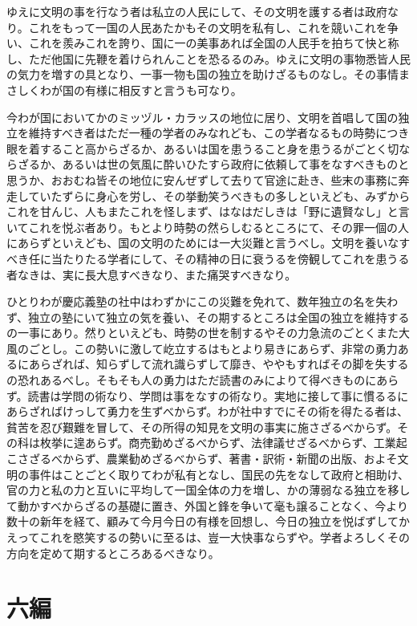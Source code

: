 \documentclass[a4paper, platex, dvipdfmx]{jsarticle}
\begin{document}
ゆえに文明の事を行なう者は私立の人民にして、その文明を護する者は政府なり。これをもって一国の人民あたかもその文明を私有し、これを競いこれを争い、これを羨みこれを誇り、国に一の美事あれば全国の人民手を拍ちて快と称し、ただ他国に先鞭を着けられんことを恐るるのみ。ゆえに文明の事物悉皆人民の気力を増すの具となり、一事一物も国の独立を助けざるものなし。その事情まさしくわが国の有様に相反すと言うも可なり。

今わが国においてかのミッヅル・カラッスの地位に居り、文明を首唱して国の独立を維持すべき者はただ一種の学者のみなれども、この学者なるもの時勢につき眼を着すること高からざるか、あるいは国を患うること身を患うるがごとく切ならざるか、あるいは世の気風に酔いひたすら政府に依頼して事をなすべきものと思うか、おおむね皆その地位に安んぜずして去りて官途に赴き、些末の事務に奔走していたずらに身心を労し、その挙動笑うべきもの多しといえども、みずからこれを甘んじ、人もまたこれを怪しまず、はなはだしきは「野に遺賢なし」と言いてこれを悦ぶ者あり。もとより時勢の然らしむるところにて、その罪一個の人にあらずといえども、国の文明のためには一大災難と言うべし。文明を養いなすべき任に当たりたる学者にして、その精神の日に衰うるを傍観してこれを患うる者なきは、実に長大息すべきなり、また痛哭すべきなり。

ひとりわが慶応義塾の社中はわずかにこの災難を免れて、数年独立の名を失わず、独立の塾にいて独立の気を養い、その期するところは全国の独立を維持するの一事にあり。然りといえども、時勢の世を制するやその力急流のごとくまた大風のごとし。この勢いに激して屹立するはもとより易きにあらず、非常の勇力あるにあらざれば、知らずして流れ識らずして靡き、ややもすればその脚を失するの恐れあるべし。そもそも人の勇力はただ読書のみによりて得べきものにあらず。読書は学問の術なり、学問は事をなすの術なり。実地に接して事に慣るるにあらざればけっして勇力を生ずべからず。わが社中すでにその術を得たる者は、貧苦を忍び艱難を冒して、その所得の知見を文明の事実に施さざるべからず。その科は枚挙に遑あらず。商売勤めざるべからず、法律議せざるべからず、工業起こさざるべからず、農業勧めざるべからず、著書・訳術・新聞の出版、およそ文明の事件はことごとく取りてわが私有となし、国民の先をなして政府と相助け、官の力と私の力と互いに平均して一国全体の力を増し、かの薄弱なる独立を移して動かすべからざるの基礎に置き、外国と鋒を争いて毫も譲ることなく、今より数十の新年を経て、顧みて今月今日の有様を回想し、今日の独立を悦ばずしてかえってこれを愍笑するの勢いに至るは、豈一大快事ならずや。学者よろしくその方向を定めて期するところあるべきなり。

\section{六編}
\end{document}
